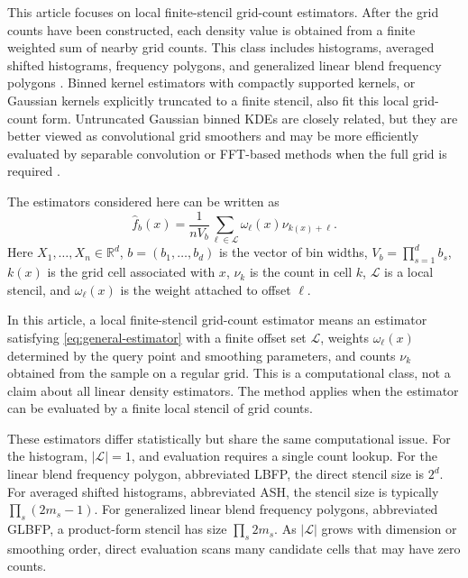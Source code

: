 \documentclass[pdflatex,sn-mathphys-ay]{sn-jnl}
\theoremstyle{thmstyleone}
\newcommand{\fhatb}{\widehat{f}_b}
\newcommand{\stencil}{\mathcal{L}}
\begin{document}
This article focuses on local finite-stencil grid-count estimators. After the grid counts have been constructed, each density value is obtained from a finite weighted sum of nearby grid counts. This class includes histograms, averaged shifted histograms, frequency polygons, and generalized linear blend frequency polygons \citep{Scott1985ASH,Scott1985FrequencyPolygon,Scott2015MDE}. Binned kernel estimators with compactly supported kernels, or Gaussian kernels explicitly truncated to a finite stencil, also fit this local grid-count form. Untruncated Gaussian binned KDEs are closely related, but they are better viewed as convolutional grid smoothers and may be more efficiently evaluated by separable convolution or FFT-based methods when the full grid is required \citep{Silverman1982FFT,Wand1994FastKDE,GramackiGramacki2017}.

The estimators considered here can be written as
\begin{equation}
\fhatb(x)
=
\frac{1}{nV_b}
\sum_{\ell \in \stencil}
\omega_\ell(x)\nu_{k(x)+\ell}.
\label{eq:general-estimator}
\end{equation}
Here \(X_1,\ldots,X_n\in\mathbb{R}^d\), \(b=(b_1,\ldots,b_d)\) is the vector of bin widths, \(V_b=\prod_{s=1}^d b_s\), \(k(x)\) is the grid cell associated with \(x\), \(\nu_k\) is the count in cell \(k\), \(\stencil\) is a local stencil, and \(\omega_\ell(x)\) is the weight attached to offset \(\ell\).

In this article, a local finite-stencil grid-count estimator means an estimator satisfying \eqref{eq:general-estimator} with a finite offset set \(\stencil\), weights \(\omega_\ell(x)\) determined by the query point and smoothing parameters, and counts \(\nu_k\) obtained from the sample on a regular grid. This is a computational class, not a claim about all linear density estimators. The method applies when the estimator can be evaluated by a finite local stencil of grid counts.

These estimators differ statistically but share the same computational issue. For the histogram, \(|\stencil|=1\), and evaluation requires a single count lookup. For the linear blend frequency polygon, abbreviated LBFP, the direct stencil size is \(2^d\). For averaged shifted histograms, abbreviated ASH, the stencil size is typically \(\prod_s(2m_s-1)\). For generalized linear blend frequency polygons, abbreviated GLBFP, a product-form stencil has size \(\prod_s 2m_s\). As \(|\stencil|\) grows with dimension or smoothing order, direct evaluation scans many candidate cells that may have zero counts.
\end{document}
